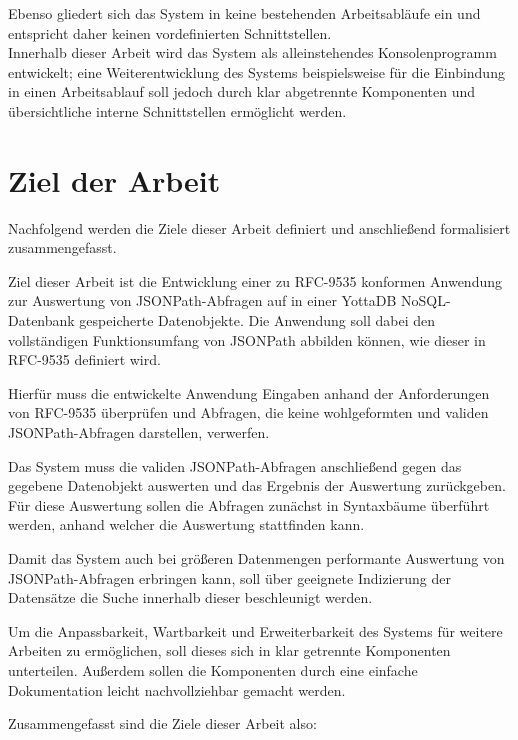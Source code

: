 \documentclass[oneside]{ausarbeitung}
\begin{document}
Ebenso gliedert sich das System in keine bestehenden Arbeitsabläufe ein und entspricht daher keinen vordefinierten Schnittstellen. \\
Innerhalb dieser Arbeit wird das System als alleinstehendes Konsolenprogramm entwickelt; eine Weiterentwicklung des Systems beispielsweise für die Einbindung in einen Arbeitsablauf soll jedoch durch klar abgetrennte Komponenten und übersichtliche interne Schnittstellen ermöglicht werden.

\section{Ziel der Arbeit}
\label{sec:ziel}

Nachfolgend werden die Ziele dieser Arbeit definiert und anschließend formalisiert zusammengefasst.
	
Ziel dieser Arbeit ist die Entwicklung einer zu RFC-9535 konformen Anwendung zur Auswertung von JSONPath-Abfragen auf in einer YottaDB NoSQL-Datenbank gespeicherte Datenobjekte. Die Anwendung soll dabei den vollständigen Funktionsumfang von JSONPath abbilden können, wie dieser in RFC-9535 definiert wird.
	
Hierfür muss die entwickelte Anwendung Eingaben anhand der Anforderungen von RFC-9535 überprüfen und Abfragen, die keine wohlgeformten und validen JSONPath-Abfragen darstellen, verwerfen. 
	
\pagebreak	

Das System muss die validen JSONPath-Abfragen anschließend gegen das gegebene Datenobjekt auswerten und das Ergebnis der Auswertung zurückgeben. Für diese Auswertung sollen die Abfragen zunächst in Syntaxbäume überführt werden, anhand welcher die Auswertung stattfinden kann.
	
Damit das System auch bei größeren Datenmengen performante Auswertung von JSONPath-Abfragen erbringen kann, soll über geeignete Indizierung der Datensätze die Suche innerhalb dieser beschleunigt werden. 
	
Um die Anpassbarkeit, Wartbarkeit und Erweiterbarkeit des Systems für weitere Arbeiten zu ermöglichen, soll dieses sich in klar getrennte Komponenten unterteilen. Außerdem sollen die Komponenten durch eine einfache Dokumentation leicht nachvollziehbar gemacht werden.

Zusammengefasst sind die Ziele dieser Arbeit also:
	
\end{document}
